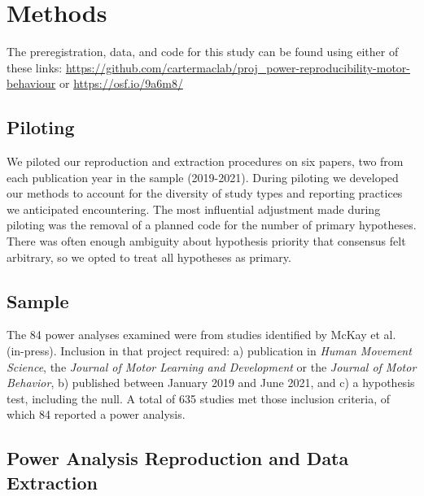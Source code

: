 \documentclass[
  man, donotrepeattitle,mask,floatsintext]{apa7}
\begin{document}
\hypertarget{methods}{%
\section{Methods}\label{methods}}

The preregistration, data, and code for this study can be found using either of these links: \url{https://github.com/cartermaclab/proj_power-reproducibility-motor-behaviour} or \url{https://osf.io/9a6m8/}

\hypertarget{piloting}{%
\subsection{Piloting}\label{piloting}}

We piloted our reproduction and extraction procedures on six papers, two from each publication year in the sample (2019-2021). During piloting we developed our methods to account for the diversity of study types and reporting practices we anticipated encountering. The most influential adjustment made during piloting was the removal of a planned code for the number of primary hypotheses. There was often enough ambiguity about hypothesis priority that consensus felt arbitrary, so we opted to treat all hypotheses as primary.

\hypertarget{sample}{%
\subsection{Sample}\label{sample}}

The 84 power analyses examined were from studies identified by McKay et al. (in-press). Inclusion in that project required: a) publication in \emph{Human Movement Science}, the \emph{Journal of Motor Learning and Development} or the \emph{Journal of Motor Behavior}, b) published between January 2019 and June 2021, and c) a hypothesis test, including the null. A total of 635 studies met those inclusion criteria, of which 84 reported a power analysis.

\hypertarget{power-analysis-reproduction-and-data-extraction}{%
\subsection{Power Analysis Reproduction and Data Extraction}\label{power-analysis-reproduction-and-data-extraction}}
\end{document}

